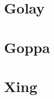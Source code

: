 \documentclass[a4paper,10pt]{report}
\begin{document}
        \section{Golay}

        \section{Goppa}

        \section{Xing}
\end{document}
